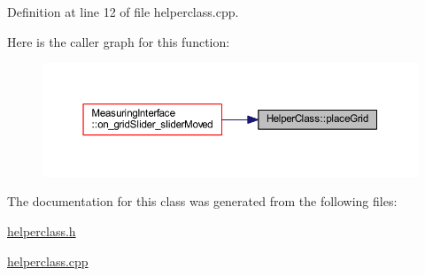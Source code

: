 Definition at line 12 of file helperclass.\+cpp.

Here is the caller graph for this function\+:
\nopagebreak
\begin{figure}[H]
\begin{center}
\leavevmode
\includegraphics[width=350pt]{class_helper_class_a2628c0f86fb5959325f6aa4272b6f210_icgraph}
\end{center}
\end{figure}


The documentation for this class was generated from the following files\+:\begin{DoxyCompactItemize}
\item 
\mbox{\hyperlink{helperclass_8h}{helperclass.\+h}}\item 
\mbox{\hyperlink{helperclass_8cpp}{helperclass.\+cpp}}\end{DoxyCompactItemize}
